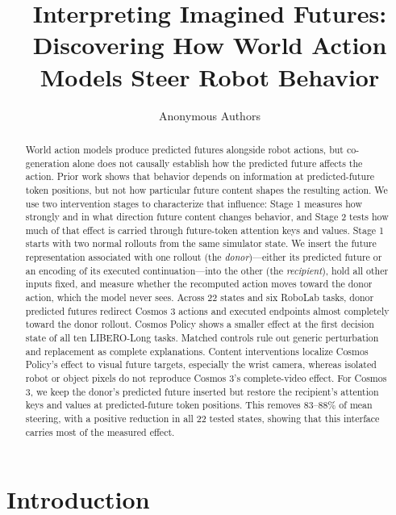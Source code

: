 \documentclass{article}
\title{Interpreting Imagined Futures: Discovering How World Action Models Steer Robot Behavior}
\author{Anonymous Authors}
\begin{document}
\maketitle

\begin{abstract}
World action models produce predicted futures alongside robot actions, but co-generation alone does not causally establish how the predicted future affects the action. Prior work shows that behavior depends on information at predicted-future token positions, but not how particular future content shapes the resulting action. We use two intervention stages to characterize that influence: Stage 1 measures how strongly and in what direction future content changes behavior, and Stage 2 tests how much of that effect is carried through future-token attention keys and values. Stage 1 starts with two normal rollouts from the same simulator state. We insert the future representation associated with one rollout (the \emph{donor})---either its predicted future or an encoding of its executed continuation---into the other (the \emph{recipient}), hold all other inputs fixed, and measure whether the recomputed action moves toward the donor action, which the model never sees. Across 22 states and six RoboLab tasks, donor predicted futures redirect Cosmos 3 actions and executed endpoints almost completely toward the donor rollout. Cosmos Policy shows a smaller effect at the first decision state of all ten LIBERO-Long tasks. Matched controls rule out generic perturbation and replacement as complete explanations. Content interventions localize Cosmos Policy's effect to visual future targets, especially the wrist camera, whereas isolated robot or object pixels do not reproduce Cosmos 3's complete-video effect. For Cosmos 3, we keep the donor's predicted future inserted but restore the recipient's attention keys and values at predicted-future token positions. This removes 83--88\% of mean steering, with a positive reduction in all 22 tested states, showing that this interface carries most of the measured effect.
\end{abstract}



\iffalse

\section{Introduction}
\label{sec:introduction}
\end{document}
